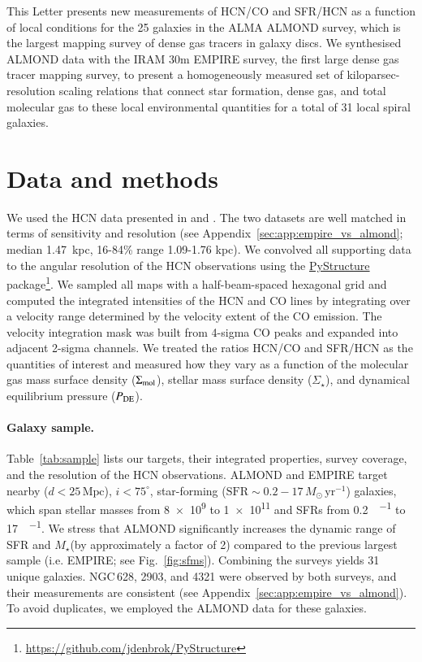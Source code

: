\documentclass[letter, longauth]{aa} %
\newcommand*{\mstar}{\ensuremath{M_{\star}}\xspace}  %
\begin{document}
This Letter presents new measurements of HCN/CO and SFR/HCN as a function of local conditions for the 25 galaxies in the ALMA ALMOND survey, which is the largest mapping survey of dense gas tracers in galaxy discs. 
We synthesised ALMOND data with the IRAM 30m EMPIRE survey, the first large dense gas tracer mapping survey, to present a homogeneously measured set of kiloparsec-resolution scaling relations that connect star formation, dense gas, and total molecular gas to these local environmental quantities for a total of 31 local spiral galaxies. 

\section{Data and methods}
\label{sec:data}
We used the HCN data presented in \citet[][EMPIRE]{Jimenez-Donaire2019} and \citet[][ALMOND]{Neumann2023a}.
The two datasets are well matched in terms of sensitivity and resolution (see Appendix~\ref{sec:app:empire_vs_almond}; median 1.47~kpc, 16{-}84\% range 1.09{-}1.76 kpc). 
We convolved all supporting data to the angular resolution of the HCN observations using the \href{https://zenodo.org/records/13787728}{PyStructure} package\footnote{\url{https://github.com/jdenbrok/PyStructure}}. 
We sampled all maps with a half-beam-spaced hexagonal grid and computed the integrated intensities of the HCN and CO lines by integrating over a velocity range determined by the velocity extent of the CO emission. 
The velocity integration mask was built from 4-sigma CO peaks and expanded into adjacent 2-sigma channels.
We treated the ratios HCN/CO and SFR/HCN as the quantities of interest and measured how they vary as a function of the molecular gas mass surface density ($\Sigma_{\rm mol}$), stellar mass surface density ($\Sigma_\star$), and dynamical equilibrium pressure ($P_{\rm DE}$).

\paragraph{Galaxy sample.} 

Table~\ref{tab:sample} lists our targets, their integrated properties, survey coverage, and the resolution of the HCN observations. 
ALMOND and EMPIRE target nearby ($d<25\,\mathrm{Mpc}$), $i<75^\circ$, star-forming ($\mathrm{SFR}\sim0.2-17\,M_\odot\,\mathrm{yr}^{-1}$) galaxies, which span stellar masses from \SI{8e9}{\msun} to \SI{1e11}{\msun} and SFRs from \SI{0.2}{\msun\per\year} to \SI{17}{\msun\per\year}.
We stress that ALMOND significantly increases the dynamic range of SFR and \mstar (by approximately a factor of 2) compared to the previous largest sample (i.e. EMPIRE; see Fig.~\ref{fig:sfms}).
Combining the surveys yields 31 unique galaxies.
NGC\,628, 2903, and 4321 were observed by both surveys, and their measurements are consistent (see Appendix~\ref{sec:app:empire_vs_almond}). 
To avoid duplicates, we employed the ALMOND data for these galaxies.
\end{document}
